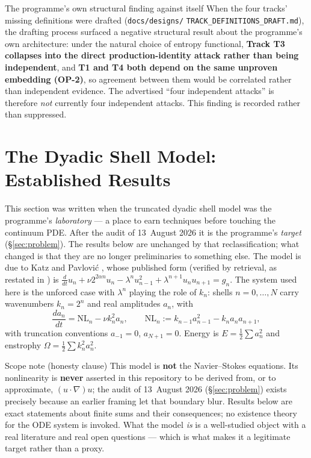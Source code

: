 \documentclass[11pt,a4paper]{article}
\theoremstyle{definition}
\theoremstyle{plain}
\begin{document}
\begin{keybox}{The programme's own structural finding against itself}
When the four tracks' missing definitions were drafted (\texttt{docs/designs/}
\texttt{TRACK\_DEFINITIONS\_DRAFT.md}), the drafting process surfaced a negative structural
result about the programme's own architecture: under the natural choice of entropy functional,
\textbf{Track T3 collapses into the direct production-identity attack rather than being
independent}, and \textbf{T1 and T4 both depend on the same unproven embedding (OP-2)}, so
agreement between them would be correlated rather than independent evidence. The advertised
``four independent attacks'' is therefore \emph{not} currently four independent attacks. This
finding is recorded rather than suppressed.
\end{keybox}

\section{The Dyadic Shell Model: Established Results}
\label{sec:dyadic}

This section was written when the truncated dyadic shell model was the programme's
\emph{laboratory} --- a place to earn techniques before touching the continuum PDE. After the
audit of 13~August 2026 it is the programme's \emph{target} (\S\ref{sec:problem}). The results
below are unchanged by that reclassification; what changed is that they are no longer
preliminaries to something else. The model is due to Katz and Pavlovi\'c
\cite{katz-pavlovic}, whose published form (verified by retrieval, as restated in
\cite{cheskidov}) is
$\frac{d}{dt}u_n+\nu2^{2\alpha n}u_n-\lambda^nu_{n-1}^2+\lambda^{n+1}u_nu_{n+1}=g_n$.
The system used here is the unforced case with $\lambda^n$ playing the role of $k_n$: shells
$n=0,\dots,N$ carry wavenumbers $k_n=2^n$ and real amplitudes $a_n$, with
\begin{equation}
\frac{da_n}{dt}=\mathrm{NL}_n-\nu k_n^2 a_n,
\qquad
\mathrm{NL}_n := k_{n-1}a_{n-1}^2-k_na_na_{n+1},
\label{eq:shell}
\end{equation}
with truncation conventions $a_{-1}=0$, $a_{N+1}=0$. Energy is
$E=\tfrac12\sum a_n^2$ and enstrophy $\Omega=\tfrac12\sum k_n^2a_n^2$.

\begin{keybox}{Scope note (honesty clause)}
This model is \textbf{not} the Navier--Stokes equations. Its nonlinearity is \textbf{never}
asserted in this repository to be derived from, or to approximate, $(u\cdot\nabla)u$; the
audit of 13~August 2026 (\S\ref{sec:problem}) exists precisely because an earlier framing let
that boundary blur. Results below are exact statements about finite sums and their
consequences; no existence theory for the ODE system is invoked. What the model \emph{is} is a
well-studied object with a real literature and real open questions --- which is what makes it a
legitimate target rather than a proxy.
\end{keybox}
\end{document}
